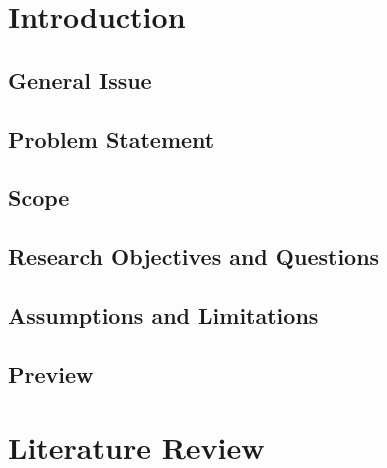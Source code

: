 \documentclass[12pt,letterpaper,oneside]{book}
\begin{document}
%
\frontmatter\flyleaf
    \disclaimerpage
    \titlepageAFIT
    \committeepage
    
    
    \tableofcontents
    \listoffigures
    \listoftables
    \listofabbreviations

\mainmatter
	\chapter{Introduction}
    \label{Intro}
    	\section{General Issue}
   		\label{geniss}
    	
    	
    	\section{Problem Statement}
   		\label{probst}
    	
    	
    	\section{Scope}
        \label{Scope}
        
        
    	\section{Research Objectives and Questions}
    	\label{ObjandQs}
        
        
        \section{Assumptions and Limitations}
        \label{Assums_Limits}
        
        
        \section{Preview}
        \label{preview}
        

	\chapter{Literature Review}
    \label{LitReview}
 
\end{document}
